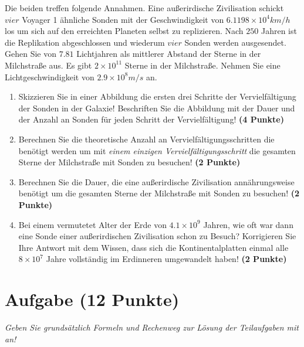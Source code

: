 \documentclass[a4paper, 9pt]{scrartcl}\usepackage[]{graphicx}\usepackage[]{xcolor}
\begin{document}
Die beiden treffen folgende Annahmen. Eine außerirdische Zivilisation schickt $vier$ Voyager 1 ähnliche Sonden mit der Geschwindigkeit von $\ensuremath{6.1198\times 10^{4}}km/h$ los um sich auf den erreichten Planeten selbst zu replizieren. Nach $250$ Jahren ist die Replikation abgeschlossen und wiederum $vier$ Sonden werden ausgesendet. Gehen Sie von $7.81$ Lichtjahren als mittlerer Abstand der Sterne in der Milchstraße aus. Es gibt $\ensuremath{2\times 10^{11}}$ Sterne in der Milchstraße. Nehmen Sie eine Lichtgeschwindigkeit von $\ensuremath{2.9\times 10^{8}}m/s$ an.

\begin{enumerate}
\item Skizzieren Sie in einer Abbildung die ersten drei Schritte der Vervielfältigung der Sonden in der Galaxie! Beschriften Sie die Abbildung mit der Dauer und der Anzahl an Sonden für jeden Schritt der Vervielfältigung! \textbf{(4 Punkte)}
\item Berechnen Sie die theoretische Anzahl an Vervielfältigungsschritten die benötigt werden um mit \textit{einem einzigen Vervielfältigungsschritt} die gesamten Sterne der Milchstraße mit Sonden zu besuchen! \textbf{(2 Punkte)}
\item Berechnen Sie die Dauer, die eine außerirdische Zivilisation annährungsweise benötigt um die gesamten Sterne der Milchstraße mit Sonden zu besuchen! \textbf{(2 Punkte)}
\item Bei einem vermutetet Alter der Erde von $\ensuremath{4.1\times 10^{9}}$ Jahren, wie oft war dann eine Sonde einer außerirdischen Zivilisation schon zu Besuch? Korrigieren Sie Ihre Antwort mit dem Wissen, dass sich die Kontinentalplatten einmal alle $\ensuremath{8\times 10^{7}}$ Jahre vollständig im Erdinneren umgewandelt haben! \textbf{(2 Punkte)}
\end{enumerate}


 
\clearpage

\section{Aufgabe \hfill (12 Punkte)}

\textit{Geben Sie grundsätzlich Formeln und Rechenweg zur Lösung der Teilaufgaben mit an!} \\[1Ex]
 
\end{document}
